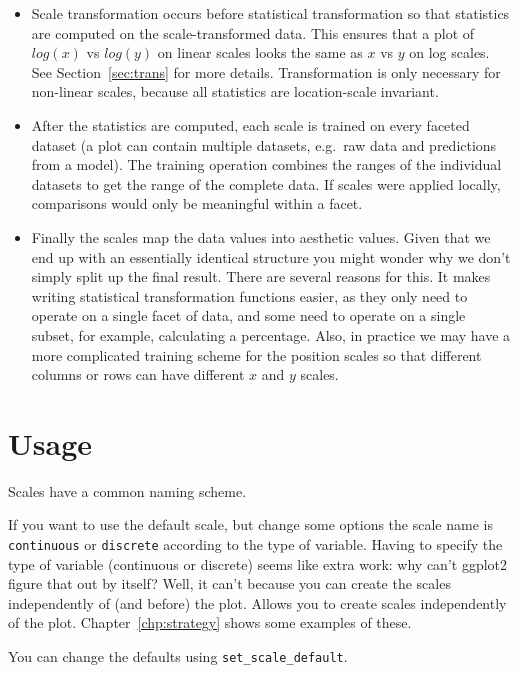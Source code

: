 \begin{itemize}
	\item  Scale transformation occurs before statistical transformation so that statistics are computed on the scale-transformed data.  This ensures that a plot of $log(x)$ vs $log(y)$ on linear scales looks the same as $x$ vs $y$ on log scales.  See Section~\ref{sec:trans} for more details. Transformation is only necessary for non-linear scales, because all statistics are location-scale invariant.

	\item After the statistics are computed, each scale is trained on every faceted dataset (a plot can contain multiple datasets, e.g.\ raw data and predictions from a model).  The training operation combines the ranges of the individual datasets to get the range of the complete data.  If scales were applied locally, comparisons would only be meaningful within a facet.

	\item Finally the scales map the data values into aesthetic values. Given that we end up with an essentially identical structure you might wonder why we don't simply split up the final result.  There are several reasons for this.  It makes writing statistical transformation functions easier, as they only need to operate on a single facet of data, and some need to operate on a single subset, for example, calculating a percentage.  Also, in practice we may have a more complicated training scheme for the position scales so that different columns or rows can have different $x$ and $y$ scales.  
	
\end{itemize}

\section{Usage}

Scales have a common naming scheme.  

If you want to use the default scale, but change some options the scale name is {\tt continuous} or {\tt discrete} according to the type of variable.  Having to specify the type of variable (continuous or discrete) seems like extra work: why can't ggplot2 figure that out by itself?  Well, it can't because you can create the scales independently of (and before) the plot.  Allows you to create scales independently of the plot.  Chapter~\ref{chp:strategy} shows some examples of these.

You can change the defaults using \verb|set_scale_default|.

